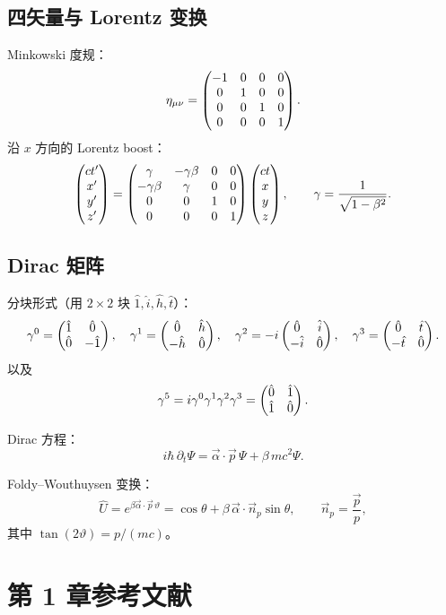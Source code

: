 \subsection{四矢量与 Lorentz 变换}
\label{sec:1.6.6}

Minkowski 度规：
\[
\eta_{\mu\nu} = \begin{pmatrix}-1&0&0&0\\0&1&0&0\\0&0&1&0\\0&0&0&1\end{pmatrix}.
\]
沿 $x$ 方向的 Lorentz boost：
\[
\begin{pmatrix}ct'\\x'\\y'\\z'\end{pmatrix}
= \begin{pmatrix}\gamma&-\gamma\beta&0&0\\-\gamma\beta&\gamma&0&0\\0&0&1&0\\0&0&0&1\end{pmatrix}
  \begin{pmatrix}ct\\x\\y\\z\end{pmatrix},
\qquad \gamma = \frac{1}{\sqrt{1-\beta^{2}}}.
\]

\subsection{Dirac 矩阵}
\label{sec:1.6.7}

分块形式（用 $2\times 2$ 块 $\hat{1},\hat{i},\hat{h},\hat{t}$）：
\[
\gamma^{0} = \begin{pmatrix}\hat{1}&\hat{0}\\\hat{0}&-\hat{1}\end{pmatrix},\quad
\gamma^{1} = \begin{pmatrix}\hat{0}&\hat{h}\\-\hat{h}&\hat{0}\end{pmatrix},\quad
\gamma^{2} = -i\begin{pmatrix}\hat{0}&\hat{i}\\-\hat{i}&\hat{0}\end{pmatrix},\quad
\gamma^{3} = \begin{pmatrix}\hat{0}&\hat{t}\\-\hat{t}&\hat{0}\end{pmatrix}.
\]
以及
\[
\gamma^{5} = i\gamma^{0}\gamma^{1}\gamma^{2}\gamma^{3}
= \begin{pmatrix}\hat{0}&\hat{1}\\\hat{1}&\hat{0}\end{pmatrix}.
\]

Dirac 方程：
\[
i\hbar\,\partial_{t}\Psi = \vec{\alpha}\!\cdot\!\vec{p}\,\Psi + \beta\,mc^{2}\Psi.
\]

Foldy--Wouthuysen 变换：
\[
\hat{U} = e^{\beta\vec{\alpha}\!\cdot\!\vec{p}\,\vartheta}
= \cos\theta + \beta\,\vec{\alpha}\!\cdot\!\vec{n}_{p}\sin\theta,\qquad
\vec{n}_{p} = \frac{\vec{p}}{p},
\]
其中 $\tan(2\vartheta) = p/(mc)$。

\section*{第 1 章参考文献}

